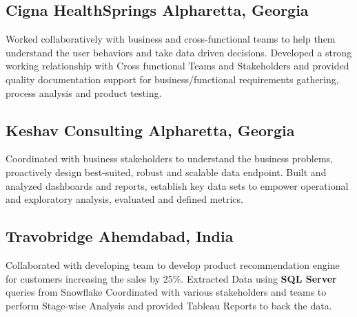 \documentclass[]{Keval-resume}
\begin{document}
\begin{flushleft}
\sectionsep

\subsection{{Cigna HealthSprings} \hfill \normalfont A\lowercase{lpharetta,} G\lowercase{eorgia} }
\textbullet{}Worked collaboratively with business and cross-functional teams to help them understand the user behaviors and take data driven decisions.
\linebreak
\textbullet{} Developed a strong working relationship with Cross functional Teams and Stakeholders and provided quality documentation support for business/functional requirements gathering, process analysis and product testing.

\sectionsep

\subsection{{Keshav Consulting} \hfill \normalfont A\lowercase{lpharetta,} G\lowercase{eorgia} }
\textbullet{} Coordinated with business stakeholders to understand the business problems, proactively design best-suited, robust and \linebreak scalable data endpoint. \linebreak
\textbullet{} Built and analyzed dashboards and reports, establish key data sets to empower operational and exploratory analysis, evaluated \linebreak and defined metrics. \\

\sectionsep

\subsection{{Travobridge} \hfill \normalfont A\lowercase{hemdabad,} I\lowercase{ndia} }
\textbullet{} Collaborated with developing team to develop product recommendation engine for customers increasing the sales by 25\%.\linebreak
\textbullet{} Extracted Data using\textbf{ SQL Server} queries from Snowflake \linebreak
\textbullet{}Coordinated with various stakeholders and teams to perform Stage-wise Analysis and provided Tableau Reports to back the \linebreak data.


\end{flushleft}
\end{document}
